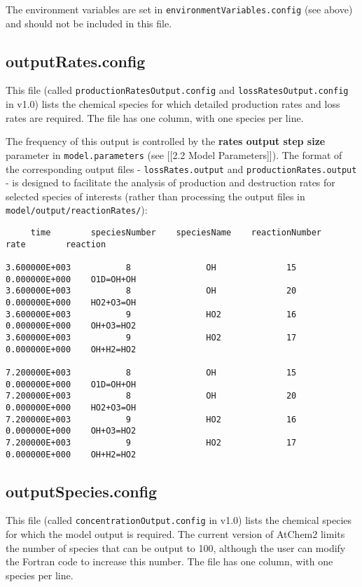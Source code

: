 The environment variables are set in
\texttt{environmentVariables.config} (see above) and should not be
included in this file.

\subsection{outputRates.config} \label{outputrates.config}

This file (called \texttt{productionRatesOutput.config} and
\texttt{lossRatesOutput.config} in v1.0) lists the chemical species for
which detailed production rates and loss rates are required. The file
has one column, with one species per line.

The frequency of this output is controlled by the \textbf{rates output
step size} parameter in \texttt{model.parameters} (see {[}{[}2.2 Model
Parameters{]}{]}). The format of the corresponding output files -
\texttt{lossRates.output} and \texttt{productionRates.output} - is
designed to facilitate the analysis of production and destruction rates
for selected species of interests (rather than processing the output
files in \texttt{model/output/reactionRates/}):

\begin{verbatim}
     time        speciesNumber    speciesName    reactionNumber         rate        reaction

3.600000E+003           8               OH              15         0.000000E+000    O1D=OH+OH
3.600000E+003           8               OH              20         0.000000E+000    HO2+O3=OH
3.600000E+003           9               HO2             16         0.000000E+000    OH+O3=HO2
3.600000E+003           9               HO2             17         0.000000E+000    OH+H2=HO2

7.200000E+003           8               OH              15         0.000000E+000    O1D=OH+OH
7.200000E+003           8               OH              20         0.000000E+000    HO2+O3=OH
7.200000E+003           9               HO2             16         0.000000E+000    OH+O3=HO2
7.200000E+003           9               HO2             17         0.000000E+000    OH+H2=HO2
\end{verbatim}

\subsection{outputSpecies.config} \label{outputspecies.config}

This file (called \texttt{concentrationOutput.config} in v1.0) lists the
chemical species for which the model output is required. The current
version of AtChem2 limits the number of species that can be output to
100, although the user can modify the Fortran code to increase this
number. The file has one column, with one species per line.

